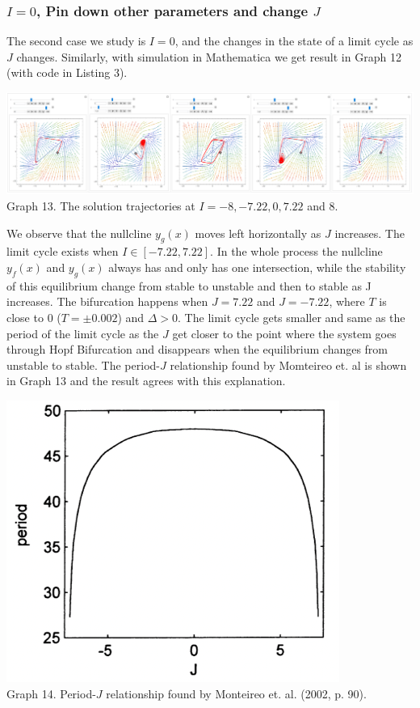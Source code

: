 \documentclass[12pt]{article}
\begin{document}
\subsubsection{$I=0$, Pin down other parameters and change $J$}

The second case we study is $I=0$, and the changes in the state of a limit cycle as $J$ changes. Similarly, with simulation in Mathematica we get result in Graph 12 (with code in Listing 3).

\begin{center}
  \includegraphics[scale=0.4]{ J-exp.png}\\
  \footnotesize{Graph 13. The solution trajectories at $I=-8,-7.22,0,7.22$ and $8$.}
  \end{center}

We observe that the nullcline $y_g(x)$ moves left horizontally as $J$ increases. The limit cycle exists when $I\in [-7.22,7.22]$. In the whole process the nullcline $y_f(x)$ and $y_g(x)$ always has and only has one intersection, while the stability of this equilibrium change from stable to unstable and then to stable as J increases. The bifurcation happens when $J=7.22$ and $J=-7.22$, where $T$ is close to $0$ ($T=\pm 0.002$) and $\Delta>0$. The limit cycle gets smaller and same as the period of the limit cycle as the $J$ get closer to the point where the system goes through Hopf Bifurcation and disappears when the equilibrium changes from unstable to stable. The period-$J$ relationship found by Momteireo et. al is shown in Graph 13 and the result agrees with this explanation. 

\begin{center}
  \includegraphics[scale=0.7]{GeneralCase02_1.png}\\
  \footnotesize{Graph 14. Period-$J$ relationship found by Monteireo et. al. (2002, p. 90). }
  \end{center}
  
\end{document}

